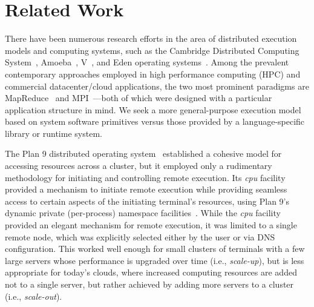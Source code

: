 \documentclass{sig-alternate}
\begin{document}
\section{Related Work}

There have been numerous research efforts in the area of
distributed execution models and computing systems, such as 
the Cambridge Distributed Computing System~\cite{Needham82}, Amoeba~\cite{Mullender90}, V~\cite{CHERITON88}, and Eden operating 
systems~\cite{Almes:Black:Lazowksa:Noe:ieee:tose:1985}.  
Among the prevalent contemporary approaches employed in
high performance computing (HPC) and commercial datacenter/cloud applications,
the two most prominent paradigms are MapReduce~\cite{Dean:mapreduce}
and MPI~\cite{234000}---both of which were designed with a particular application
structure in mind.  We seek a more general-purpose execution model
based on system software primitives versus those provided by a language-specific
library or runtime system.

The Plan 9 distributed operating system~\cite{pike95plan} established a cohesive model for 
accessing resources across a cluster, but it employed only a rudimentary 
methodology for initiating and controlling remote execution.
Its \emph{cpu} facility provided a mechanism to initiate remote execution while 
providing seamless access to certain aspects of the initiating terminal's 
resources, using Plan 9's dynamic private (per-process) namespace facilities~\cite{namespace}. 
While the \emph{cpu} facility provided an elegant mechanism for remote execution,
it was limited to a single remote node, which was explicitly selected either
by the user or via DNS configuration.  This worked well enough for small clusters
of terminals with a few large servers whose performance is upgraded over time (i.e., {\it scale-up}), but is less appropriate
for today's clouds, where increased computing resources are added not
to a single server, but rather achieved by adding more servers to a cluster (i.e., {\it scale-out}).

\end{document}
